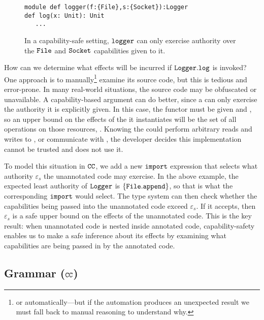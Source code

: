 \begin{figure}
\vspace*{-5mm}
\begin{lstlisting}
module def logger(f:{File},s:{Socket}):Logger
def log(x: Unit): Unit
   ...
\end{lstlisting}
\vspace*{-5mm}
\caption{In a capability-safe setting, $\mathtt{logger}$ can only exercise authority over the $\mathtt{File}$ and $\mathtt{Socket}$ capabilities given to it.}
\label{fig:cc_motivation}
\end{figure}

How can we determine what effects will be incurred if $\mathtt{Logger.log}$ is
invoked? One approach is to manually\footnote{or automatically---but if the
  automation produces an unexpected result we must fall back to manual
  reasoning to understand why.} examine its source code, but this is
tedious and error-prone. In many real-world situations, the source
code may be obfuscated or unavailable. A capability-based argument can do
better, since a  can only exercise the authority it is explicitly
given. In this case, the  functor must be given  and
, so an upper bound on the effects of the  it
instantiates will be the set of all operations on those resources,
. Knowing the  could perform
arbitrary reads and writes to , or communicate with , the
developer decides this implementation cannot be trusted and does not use it.

To model this situation in
$\mathtt{CC}$, we add a new $\mathtt{import}$ expression
that selects what authority $\varepsilon_s$ the unannotated code may
exercise. In the above example, the expected least authority of
$\mathtt{Logger}$ is $\{ \mathtt{File.append} \}$, so that is what the
corresponding $\mathtt{import}$ would select. The type system can then
check whether the capabilities being passed into the unannotated code
exceed $\varepsilon_s$. If it accepts, then $\varepsilon_s$ is a safe
upper bound on the effects of the unannotated code. This is the
key result: when unannotated code is nested inside annotated code,
capability-safety enables us to make a safe inference about its
effects by examining what capabilities are being passed in by the
annotated code.

\subsection{Grammar ($\mathtt{CC}$)}

